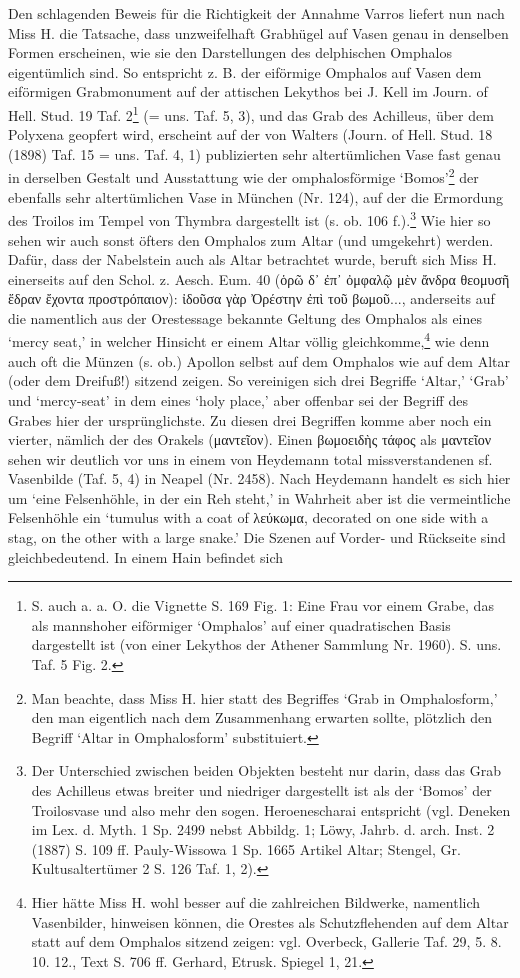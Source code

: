 \documentclass[a4paper, 11pt, oneside]{article}
\begin{document}
Den schlagenden Beweis für die Richtigkeit der Annahme Varros liefert nun nach Miss H. die Tatsache, dass unzweifelhaft Grabhügel auf Vasen genau in denselben Formen erscheinen, wie sie den Darstellungen des delphischen Omphalos eigentümlich sind. So entspricht z. B. der eiförmige Omphalos auf Vasen dem eiförmigen Grabmonument auf der attischen Lekythos bei J. Kell im Journ. of Hell. Stud. 19 Taf. 2\footnote{S. auch a. a. O. die Vignette S. 169 Fig. 1: Eine Frau vor einem Grabe, das als mannshoher eiförmiger `Omphalos' auf einer quadratischen Basis dargestellt ist (von einer Lekythos der Athener Sammlung Nr. 1960). S. uns. Taf. 5 Fig. 2.} (= uns. Taf. 5, 3), und das Grab des Achilleus, über dem Polyxena geopfert wird, erscheint auf der von Walters (Journ. of Hell. Stud. 18 (1898) Taf. 15 = uns. Taf. 4, 1) publizierten sehr altertümlichen Vase fast genau in derselben Gestalt und Ausstattung wie der omphalosförmige `Bomos'\footnote{Man beachte, dass Miss H. hier statt des Begriffes `Grab in Omphalosform,' den man eigentlich nach dem Zusammenhang erwarten sollte, plötzlich den Begriff `Altar in Omphalosform' substituiert.} der ebenfalls sehr altertümlichen Vase in München (Nr. 124), auf der die Ermordung des Troilos im Tempel von Thymbra dargestellt ist (s. ob. 106 f.).\footnote{Der Unterschied zwischen beiden Objekten besteht nur darin, dass das Grab des Achilleus etwas breiter und niedriger dargestellt ist als der `Bomos' der Troilosvase und also mehr den sogen. Heroenescharai entspricht (vgl. Deneken im Lex. d. Myth. 1 Sp. 2499 nebst Abbildg. 1; Löwy, Jahrb. d. arch. Inst. 2 (1887) S. 109 ff. Pauly-Wissowa 1 Sp. 1665 Artikel Altar; Stengel, Gr. Kultusaltertümer 2 S. 126 Taf. 1, 2).} Wie hier so sehen wir auch sonst öfters den Omphalos zum Altar (und umgekehrt) werden. Dafür, dass der Nabelstein auch als Altar betrachtet wurde, beruft sich Miss H. einerseits auf den Schol. z. Aesch. Eum. 40 (ὁρῶ δ᾽ ἐπ᾽ ὀμφαλῷ μὲν ἄνδρα θεομυσῆ ἕδραν ἔχοντα προστρόπαιον): ἰδοῦσα γὰρ Ὀρέστην ἐπὶ τοῦ βωμοῦ..., anderseits auf die namentlich aus der Orestessage bekannte Geltung des Omphalos als eines `mercy seat,' in welcher Hinsicht er einem Altar völlig gleichkomme,\footnote{Hier hätte Miss H. wohl besser auf die zahlreichen Bildwerke, namentlich Vasenbilder, hinweisen können, die Orestes als Schutzflehenden auf dem Altar statt auf dem Omphalos sitzend zeigen: vgl. Overbeck, Gallerie Taf. 29, 5. 8. 10. 12., Text S. 706 ff. Gerhard, Etrusk. Spiegel 1, 21.} wie denn auch oft die Münzen (s. ob.) Apollon selbst auf dem Omphalos wie auf dem Altar (oder dem Dreifuß!) sitzend zeigen. So vereinigen sich drei Begriffe `Altar,' `Grab' und `mercy-seat' in dem eines `holy place,' aber offenbar sei der Begriff des Grabes hier der ursprünglichste. Zu diesen drei Begriffen komme aber noch ein vierter, nämlich der des Orakels (μαντεῖον). Einen βωμοειδὴς τάφος als μαντεῖον sehen wir deutlich vor uns in einem von Heydemann total missverstandenen sf. Vasenbilde (Taf. 5, 4) in Neapel (Nr. 2458). Nach Heydemann handelt es sich hier um `eine Felsenhöhle, in der ein Reh steht,' in Wahrheit aber ist die vermeintliche Felsenhöhle ein `tumulus with a coat of λεύκωμα, decorated on one side with a stag, on the other with a large snake.' Die Szenen auf Vorder- und Rückseite sind gleichbedeutend. In einem Hain befindet sich 
\end{document}
